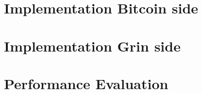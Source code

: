 \section{Implementation Bitcoin side}\label{sec:ImplementationBtc}
\section{Implementation Grin side}\label{sec:ImplementationGrin}
\section{Performance Evaluation}\label{sec:Performance}